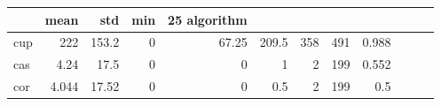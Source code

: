 \begin{tabular}{lrrrrrrrr}
\toprule
 & mean & std & min & 25%
algorithm &  &  &  &  &  &  &  &  \\
\midrule
cup & 222 & 153.2 & 0 & 67.25 & 209.5 & 358 & 491 & 0.988 \\
cas & 4.24 & 17.5 & 0 & 0 & 1 & 2 & 199 & 0.552 \\
cor & 4.044 & 17.52 & 0 & 0 & 0.5 & 2 & 199 & 0.5 \\
\bottomrule
\end{tabular}
